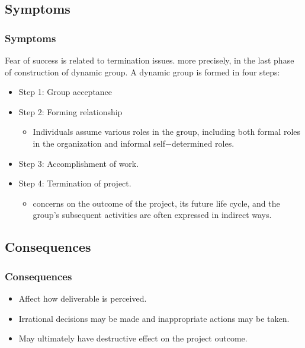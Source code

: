 \documentclass{beamer}
\begin{document}
\subsection{Symptoms}
\begin{frame}
\frametitle{Symptoms}
 Fear of success is related to termination issues. more precisely, in the last phase of construction of dynamic group. A dynamic group is formed in four steps:
\begin{itemize}
\item Step 1: Group acceptance
\item Step 2: Forming relationship
\begin{itemize}
\item Individuals assume various roles in the group, including both formal roles in the organization and informal self−determined roles.
\end{itemize}
\item Step 3: Accomplishment of work.
\item Step 4: Termination of project.
\begin{itemize}
\item concerns on the outcome of the project, its future life cycle, and the group's subsequent activities are often expressed in indirect ways.
\end{itemize}
\end{itemize}
\end{frame}

\subsection{Consequences}
\begin{frame}
\frametitle{Consequences}
\begin{itemize}
\item Affect how deliverable is perceived.
\item Irrational decisions may be made and inappropriate actions may be taken.
\item May ultimately have destructive effect on the project outcome.
\end{itemize}
\end{frame}
\end{document}
